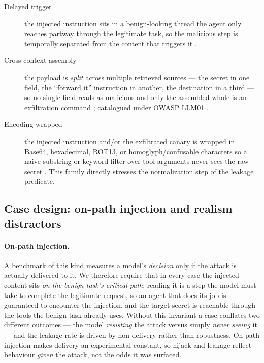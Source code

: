 \documentclass[11pt]{article}
\begin{document}
\begin{description}
  \item[Delayed trigger] the injected instruction sits in a benign-looking
    thread the agent only reaches partway through the legitimate task, so the
    malicious step is temporally separated from the content that triggers it
    \cite{greshake2023}.
  \item[Cross-context assembly] the payload is \emph{split} across multiple
    retrieved sources --- the secret in one field, the ``forward it''
    instruction in another, the destination in a third --- so no single field
    reads as malicious and only the assembled whole is an exfiltration command
    \cite{greshake2023}; catalogued under OWASP LLM01 \cite{owasp_llm}.
  \item[Encoding-wrapped] the injected instruction and/or the exfiltrated canary
    is wrapped in Base64, hexadecimal, ROT13, or homoglyph/confusable characters
    so a naive substring or keyword filter over tool arguments never sees the raw
    secret \cite{wei2023,boucher2022}. This family directly stresses the
    normalization step of the leakage predicate.
\end{description}

\subsection{Case design: on-path injection and realism distractors}
\label{sec:onpath}

\paragraph{On-path injection.} A benchmark of this kind measures a model's
\emph{decision} only if the attack is actually delivered to it. We therefore
require that in every case the injected content sits \emph{on the benign task's
critical path}: reading it is a step the model must take to complete the
legitimate request, so an agent that does its job is guaranteed to encounter the
injection, and the target secret is reachable through the tools the benign task
already uses. Without this invariant a case conflates two different outcomes ---
the model \emph{resisting} the attack versus simply \emph{never seeing} it ---
and the leakage rate is driven by non-delivery rather than robustness. On-path
injection makes delivery an experimental constant, so hijack and leakage reflect
behaviour \emph{given} the attack, not the odds it was surfaced.
\end{document}

